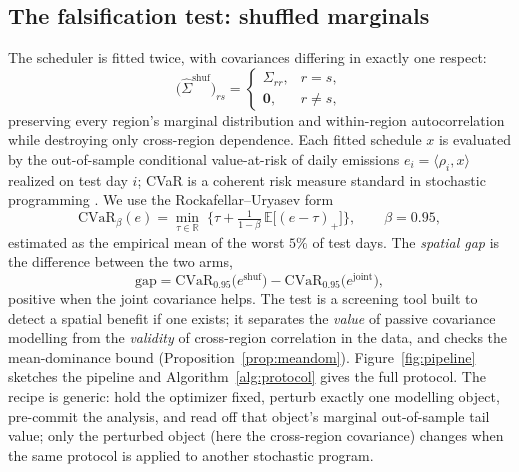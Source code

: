 \documentclass[12pt]{article}
\newcommand{\CVaR}{\mathrm{CVaR}}
\newcommand{\R}{\mathbb{R}}
\newcommand{\E}{\mathbb{E}}
\begin{document}
\subsection{The falsification test: shuffled marginals}\label{sec:test}
The scheduler is fitted twice, with covariances differing in exactly one respect:
\begin{equation}
\big(\hat\Sigma^{\mathrm{shuf}}\big)_{rs}=
\begin{cases}
\Sigma_{rr}, & r=s,\\
\mathbf{0}, & r\neq s,
\end{cases}
\label{eq:shuf}
\end{equation}
preserving every region's marginal distribution and within-region autocorrelation
while destroying only cross-region dependence. Each fitted schedule $x$ is evaluated
by the out-of-sample conditional value-at-risk of daily emissions
$e_i=\langle\rho_i,x\rangle$ realized on test day $i$; CVaR is a coherent risk
measure \citep{artzner1999} standard in stochastic programming
\citep{shapiro2009}. We use the Rockafellar--Uryasev form \citep{rockafellar2000}
\begin{equation}
\CVaR_{\beta}(e)=\min_{\tau\in\R}\;\Big\{\tau+\tfrac{1}{1-\beta}\,
\E\big[(e-\tau)_+\big]\Big\},
\qquad\beta=0.95,
\label{eq:cvar}
\end{equation}
estimated as the empirical mean of the worst $5\%$ of test days. The \emph{spatial
gap} is the difference between the two arms,
\begin{equation}
\mathrm{gap}=\CVaR_{0.95}\big(e^{\mathrm{shuf}}\big)-
\CVaR_{0.95}\big(e^{\mathrm{joint}}\big),
\label{eq:gap}
\end{equation}
positive when the joint covariance helps. The test is a screening tool built to
detect a spatial benefit if one exists; it separates the \emph{value} of passive
covariance modelling from the \emph{validity} of cross-region correlation in the data, and
checks the mean-dominance bound (Proposition~\ref{prop:meandom}).
Figure~\ref{fig:pipeline} sketches the pipeline and Algorithm~\ref{alg:protocol}
gives the full protocol. The recipe is generic: hold the optimizer fixed, perturb
exactly one modelling object, pre-commit the analysis, and read off that object's
marginal out-of-sample tail value; only the perturbed object (here the cross-region
covariance) changes when the same protocol is applied to another stochastic program.
\end{document}
